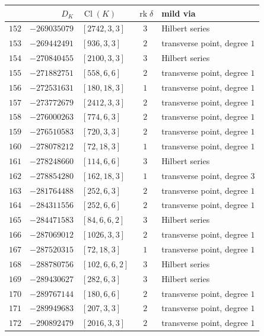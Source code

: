 \documentclass[11pt]{article}
\newcommand{\Cl}{\operatorname{Cl}}
\newcommand{\rk}{\operatorname{rk}}
\begin{document}
\begin{center}\small
\setlength{\tabcolsep}{5pt}%
\begin{longtable}{r r l c l}
\toprule
& $D_K$ & $\Cl(K)$ & $\rk\delta$ & mild via\\
\midrule
\endhead
\bottomrule
\endfoot

$152$ & $-269035079$ & $[2742,3,3]$ & $3$ & Hilbert series\\
$153$ & $-269442491$ & $[936,3,3]$ & $2$ & transverse point, degree $1$\\
$154$ & $-270840455$ & $[2100,3,3]$ & $3$ & Hilbert series\\
$155$ & $-271882751$ & $[558,6,6]$ & $2$ & transverse point, degree $1$\\
$156$ & $-272531631$ & $[180,18,3]$ & $1$ & transverse point, degree $1$\\
$157$ & $-273772679$ & $[2412,3,3]$ & $2$ & transverse point, degree $1$\\
$158$ & $-276000263$ & $[774,6,3]$ & $2$ & transverse point, degree $1$\\
$159$ & $-276510583$ & $[720,3,3]$ & $2$ & transverse point, degree $1$\\
$160$ & $-278078212$ & $[72,18,3]$ & $1$ & transverse point, degree $1$\\
$161$ & $-278248660$ & $[114,6,6]$ & $3$ & Hilbert series\\
$162$ & $-278854280$ & $[162,18,3]$ & $1$ & transverse point, degree $3$\\
$163$ & $-281764488$ & $[252,6,3]$ & $2$ & transverse point, degree $1$\\
$164$ & $-284311556$ & $[252,6,6]$ & $2$ & transverse point, degree $1$\\
$165$ & $-284471583$ & $[84,6,6,2]$ & $3$ & Hilbert series\\
$166$ & $-287069012$ & $[1026,3,3]$ & $2$ & transverse point, degree $1$\\
$167$ & $-287520315$ & $[72,18,3]$ & $1$ & transverse point, degree $1$\\
$168$ & $-288780756$ & $[102,6,6,2]$ & $3$ & Hilbert series\\
$169$ & $-289430627$ & $[282,6,3]$ & $3$ & Hilbert series\\
$170$ & $-289767144$ & $[180,6,6]$ & $2$ & transverse point, degree $1$\\
$171$ & $-289949683$ & $[207,3,3]$ & $2$ & transverse point, degree $1$\\
$172$ & $-290892479$ & $[2016,3,3]$ & $2$ & transverse point, degree $1$\\

\end{longtable}
\end{center}
\end{document}
